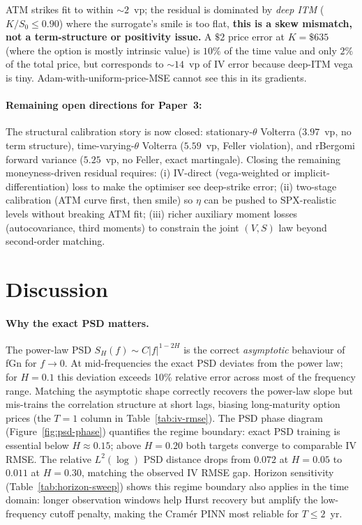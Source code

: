 \documentclass[11pt,a4paper]{article}
\begin{document}
ATM strikes fit to within $\sim\!2$~vp; the residual is dominated by
\emph{deep ITM} ($K/S_0 \leq 0.90$) where the surrogate's smile is too
flat, \textbf{this is a skew mismatch, not a term-structure or
positivity issue.} A $\$2$ price error at $K=\$635$ (where the option
is mostly intrinsic value) is $10\%$ of the time value and only $2\%$
of the total price, but corresponds to $\sim\!14$~vp of IV error
because deep-ITM vega is tiny. Adam-with-uniform-price-MSE cannot see
this in its gradients.

\paragraph{Remaining open directions for Paper~3:}
The structural calibration story is now closed: stationary-$\theta$
Volterra ($3.97$~vp, no term structure), time-varying-$\theta$
Volterra ($5.59$~vp, Feller violation), and rBergomi forward variance
($5.25$~vp, no Feller, exact martingale). Closing the remaining
moneyness-driven residual requires:
(i) IV-direct (vega-weighted or implicit-differentiation) loss to make
the optimiser see deep-strike error;
(ii) two-stage calibration (ATM curve first, then smile) so $\eta$ can
be pushed to SPX-realistic levels without breaking ATM fit;
(iii) richer auxiliary moment losses (autocovariance, third moments) to
constrain the joint $(V, S)$ law beyond second-order matching.

\section{Discussion}
\label{sec:discussion}

\paragraph{Why the exact PSD matters.}
The power-law PSD $S_H(f) \sim C|f|^{1-2H}$ is the correct
\emph{asymptotic} behaviour of fGn for $f \to 0$. At mid-frequencies
the exact PSD deviates from the power law; for $H = 0.1$ this deviation
exceeds 10\% relative error across most of the frequency range.
Matching the asymptotic shape correctly recovers the power-law slope but
mis-trains the correlation structure at short lags, biasing long-maturity
option prices (the $T = 1$ column in Table~\ref{tab:iv-rmse}).
The PSD phase diagram (Figure~\ref{fig:psd-phase}) quantifies the
regime boundary: exact PSD training is essential below $H\approx 0.15$;
above $H=0.20$ both targets converge to comparable IV RMSE. The
relative $L^2(\log)$ PSD distance drops from $0.072$ at $H=0.05$
to $0.011$ at $H=0.30$, matching the observed IV RMSE gap.
Horizon sensitivity (Table~\ref{tab:horizon-sweep}) shows this regime
boundary also applies in the time domain: longer observation windows
help Hurst recovery but amplify the low-frequency cutoff penalty,
making the Cramér PINN most reliable for $T \leq 2$~yr.
\end{document}
